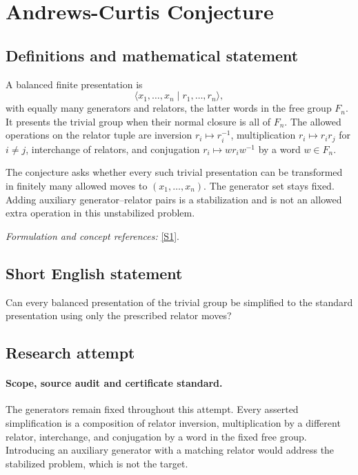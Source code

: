\documentclass[11pt]{article}
\begin{document}
\section*{\texorpdfstring{Andrews-Curtis Conjecture}{Andrews-Curtis Conjecture}}\label{statement}
\subsection{Definitions and mathematical statement}
A balanced finite presentation is
\[
 \langle x_1,\ldots,x_n\mid r_1,\ldots,r_n\rangle,
\]
with equally many generators and relators, the latter words in the free group $F_n$. It presents the trivial group when their normal closure is all of $F_n$. The allowed operations on the relator tuple are inversion $r_i\mapsto r_i^{-1}$, multiplication $r_i\mapsto r_ir_j$ for $i\ne j$, interchange of relators, and conjugation $r_i\mapsto w r_iw^{-1}$ by a word $w\in F_n$.

The conjecture asks whether every such trivial presentation can be transformed in finitely many allowed moves to $(x_1,\ldots,x_n)$. The generator set stays fixed. Adding auxiliary generator--relator pairs is a stabilization and is not an allowed extra operation in this unstabilized problem.
\par\smallskip\textit{Formulation and concept references:} \href{https://link.springer.com/article/10.1007/s10817-026-09759-8}{[S1]}.

\subsection{Short English statement}
Can every balanced presentation of the trivial group be simplified to the standard presentation using only the prescribed relator moves?
\subsection{Research attempt}

\paragraph{Scope, source audit and certificate standard.}
The generators remain fixed throughout this attempt. Every asserted
simplification is a composition of relator inversion, multiplication
by a different relator, interchange, and conjugation by a word in the
fixed free group. Introducing an auxiliary generator with a matching
relator would address the stabilized problem, which is not the target.
\end{document}
